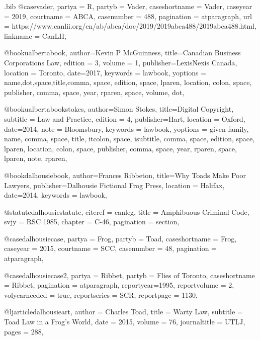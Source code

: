 \begin{filecontents*}[overwrite]{\jobname.bib}
@case{vader,	partya =  {R},	partyb =  {Vader},	caseshortname =  {Vader},	caseyear =  {2019},	courtname =  {ABCA},	casenumber =  {488},	pagination =  {atparagraph}, url =  {https://www.canlii.org/en/ab/abca/doc/2019/2019abca488/2019abca488.html},	linkname =  {CanLII},		}


@book{ualbertabook,
author={Kevin P McGuinness},
title={Canadian Business Corporations Law},
edition = {3},
volume = {1},
publisher={LexisNexis Canada},
location = {Toronto},
date={2017},
keywords = {lawbook},
yoptions = {name,dot,space,title,comma,
space,
edition,
space,
lparen, 
location,
colon,
space,
publisher,
comma,
space,
year,
rparen,
space,
volume,
dot},
}



@book{ualbertabookstokes,
author={Simon Stokes},
title={Digital Copyright},
subtitle = {Law and Practice},
edition = {4},
publisher={Hart},
location = {Oxford},
date={2014},
note = {Bloomsbury},
keywords = {lawbook},
yoptions = {given-family,
name,
comma,
space,
title,
itcolon,
space,
isubtitle,
comma,
space,
edition,
space,
lparen, 
location,
colon,
space,
publisher,
comma,
space,
year,
rparen,
space,
lparen,
note,
rparen},
}




@book{dalhousiebook,
author={Frances Ribbeton},
title={Why Toads Make Poor Lawyers},
publisher={Dalhousie Fictional Frog Press},
location = {Halifax},
date={2014},
keywords = {lawbook},
}

@statute{dalhousiestatute,
citeref = {canleg},
title = {Amphibuous Criminal Code},
svjy = {RSC 1985},
chapter = {C-46},
pagination = {section},
}

@case{dalhousiecase,
  partya = {Frog}, 
  partyb = {Toad},
  caseshortname = {Frog},
  caseyear = {2015},
  courtname = {SCC},
  casenumber = {48},
  pagination = {atparagraph},
	}

@case{dalhousiecase2,
  partya = {Ribbet}, 
  partyb = {Flies of Toronto},
  caseshortname = {Ribbet},
  pagination = {atparagraph},
  reportyear={1995},
  reportvolume = {2},
  volyearneeded = {true},
  reportseries = {SCR},
  reportpage = {1130},
	}


@ljarticle{dalhousieart,
author = {Charles Toad},
title = {Warty Law},
subtitle = {Toad Law in a Frog's World},
date = {2015},
volume = {76},
journaltitle = {UTLJ},
pages = {288},
}




\end{filecontents*}
